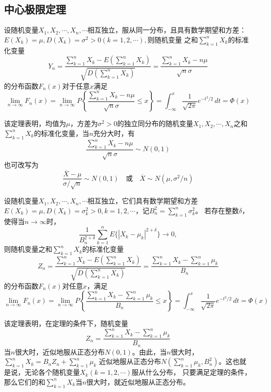 \subsection{中心极限定理}
\begin{theorem}[独立同分布的中心极限定理]
    设随机变量$X_1,X_2,\cdots,X_n,\cdots$相互独立，服从同一分布，且具有数学期望和方差：$E(X_k)=\mu,D(X_k)=\sigma^2>0(k=1,2,\cdots),$则随机变量
    之和$\displaystyle{\sum _{k=1}^n X_k}$的标准化变量
    $$Y_n=\frac{\sum\limits _{k=1}^n X_k-E(\sum\limits _{k=1} ^n X_k)}{\sqrt{D(\sum\limits_{k=1}^n X_k)}}=\frac{\sum\limits_{k=1}^n X_k-n\mu}{\sqrt{n}\sigma}$$
    的分布函数$F_n(x)$对于任意$x$满足
    $$\lim _{n\to\infty} F_n(x)=\lim _{n\to \infty}P\left\{ \frac{\sum\limits_{k=1}^n X_k-n\mu}{\sqrt{n}\sigma}\leq x\right\}=\int_{-\infty}^{x} \frac{1}{\sqrt{2\pi}} e^{-t^2/2}\,dt=\varPhi (x)  $$
\end{theorem}
\begin{remark}
    该定理表明，均值为$\mu$，方差为$\sigma^2>0$的独立同分布的随机变量$X_1,X_2,\cdots,X_n$之和$\displaystyle{\sum _{k=1}^n X_k}$的标准化变量，当$n$充分大时，有
    $$\frac{\sum\limits_{k=1}^n X_k -n\mu}{\sqrt{n}\sigma}\sim N(0,1) $$
    也可改写为$$\frac{\overline{X}-\mu}{\sigma/\sqrt{n}} \sim N(0,1) \quad \mbox{或} \quad \overline{X}\sim N(\mu,\sigma^2/n)$$
\end{remark}

\begin{theorem}
    设随机变量$X_1,X_2,\cdots,X_n,\cdots$相互独立，它们具有数学期望和方差$E(X_k)=\mu, D(X_k)=\sigma_k^2>0,k=1,2,\cdots$，记$\displaystyle{B_n^2=\sum_{k=1}^n\sigma_k^2}$。
    若存在整数$\delta$，使得当$n\to \infty$时，
    $$\frac{1}{B_n^{2+\delta}}\sum_{k=1}^n E\{{|X_k-\mu_k|}^{2+\delta}\} \to 0,$$
    则随机变量之和$\displaystyle{\sum _{k=1}^n X_k}$的标准化变量
    $$Z_n=\frac{\sum\limits _{k=1}^n X_k-E(\sum\limits _{k=1} ^n X_k)}{\sqrt{D(\sum\limits_{k=1}^n X_k)}}=\frac{\sum\limits_{k=1}^n X_k-\sum\limits_{k=1}^n \mu_k}{B_n}$$
    的分布函数$F_n(x)$对任意$x$，满足
    $$\lim_{n\to\infty} F_n(x)=\lim_{n\to\infty} P\left\{  \frac{\sum\limits_{k=1}^n X_k-\sum\limits_{k=1}^n \mu_k}{B_n}\leq x  \right\} =\int_{-\infty}^{x} \frac{1}{\sqrt{2\pi}} e^{-t^2/2}\,dt=\varPhi (x) $$
\end{theorem}

\begin{remark}
    该定理表明，在定理的条件下，随机变量 $$Z_n=\frac{\sum\limits_{k=1}^n X_k-\sum\limits_{k=1}^n \mu_k}{B_n}$$
    当$n$很大时，近似地服从正态分布$N(0,1)$。由此，当$n$很大时，$\displaystyle{\sum_{k=1}^n X_k=B_nZ_n+\sum_{k=1}^n \mu_k}$
    近似地服从正态分布$\displaystyle{N(\sum_{k=1}^n\mu_k,B_n^2)}$。这也就是说，无论各个随机变量$X_k(k=1,2,\cdots)$服从什么分布，
    只要满足定理的条件，那么它们的和$\displaystyle{\sum_{k=1}^nX_k}$当$n$很大时，就近似地服从正态分布。
\end{remark}


